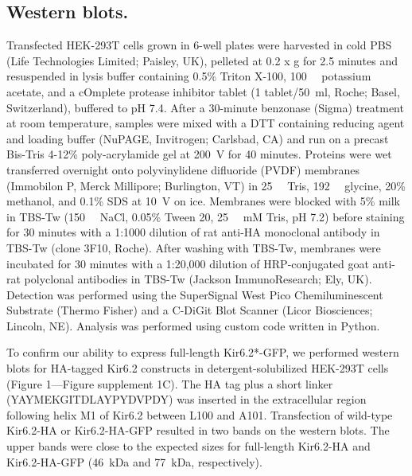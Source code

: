 \documentclass[9pt,lineno, onehalfspacing]{elife_modified}
\begin{document}
\subsection{Western blots.}
Transfected HEK-293T cells grown in 6-well plates were harvested in cold PBS (Life Technologies Limited; Paisley, UK), pelleted at 0.2 x g for 2.5 minutes and resuspended in lysis buffer containing 0.5\% Triton X-100, \SI{100}{\milli\Molar} potassium acetate, and a cOmplete protease inhibitor tablet (1 tablet/\SI{50}{\milli\litre}, Roche; Basel, Switzerland), buffered to pH 7.4.
After a 30-minute benzonase (Sigma) treatment at room temperature, samples were mixed with a DTT containing reducing agent and loading buffer (NuPAGE, Invitrogen; Carlsbad, CA) and run on a precast Bis-Tris 4-12\% poly-acrylamide gel at \SI{200}{\volt} for 40 minutes.
Proteins were wet transferred overnight onto polyvinylidene difluoride (PVDF) membranes (Immobilon P, Merck Millipore; Burlington, VT) in \SI{25}{\milli\Molar} Tris, \SI{192}{\milli\Molar} glycine, 20\% methanol, and 0.1\% SDS at \SI{10}{\volt} on ice.
Membranes were blocked with 5\% milk in TBS-Tw (\SI{150}{\milli\Molar} NaCl, 0.05\% Tween 20, \SI{25}{\milli\Molar} mM Tris, pH 7.2) before staining for 30 minutes with a 1:1000 dilution of rat anti-HA monoclonal antibody in TBS-Tw (clone 3F10, Roche).
After washing with TBS-Tw, membranes were incubated for 30 minutes with a 1:20,000 dilution of HRP-conjugated goat anti-rat polyclonal antibodies in TBS-Tw (Jackson ImmunoResearch; Ely, UK).
Detection was performed using the SuperSignal West Pico Chemiluminescent Substrate (Thermo Fisher) and a C-DiGit Blot Scanner (Licor Biosciences; Lincoln, NE).
Analysis was performed using custom code written in Python.

To confirm our ability to express full-length Kir6.2*-GFP, we performed western blots for HA-tagged Kir6.2 constructs in detergent-solubilized HEK-293T cells (Figure 1—Figure supplement 1C).
The HA tag plus a short linker (YAYMEKGITDLAYPYDVPDY) was inserted in the extracellular region following helix M1 of Kir6.2 between L100 and A101.
Transfection of wild-type Kir6.2-HA or Kir6.2-HA-GFP resulted in two bands on the western blots.
The upper bands were close to the expected sizes for full-length Kir6.2-HA and Kir6.2-HA-GFP (\SI{46}{\kilo\dalton} and \SI{77}{\kilo\dalton}, respectively).
\end{document}
